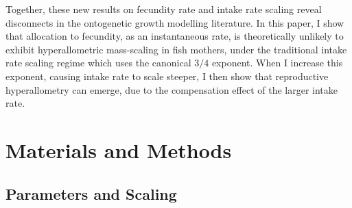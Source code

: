 \documentclass[a4paper]{article} %
\begin{document}
    Together, these new results on fecundity rate and intake rate scaling reveal disconnects in the ontogenetic growth modelling literature. In this paper, I show that allocation to fecundity, as an instantaneous rate, is theoretically unlikely to exhibit hyperallometric mass-scaling in fish mothers, under the traditional intake rate scaling regime which uses the canonical $3/4$ exponent. When I increase this exponent, causing intake rate to scale steeper, I then show that reproductive hyperallometry can emerge, due to the compensation effect of the larger intake rate.
\section{Materials and Methods}\thispagestyle{plain}
\subsection{Parameters and Scaling}
\end{document}
